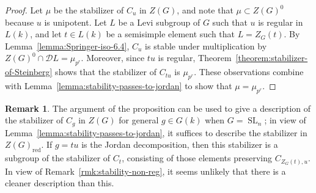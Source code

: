 \documentclass[11pt,reqno]{amsart}
\theoremstyle{definition}
\newtheorem{remark}[theorem]{Remark}
\renewcommand{\rm}{\mathrm}
\newcommand{\sD}{{\mathscr D}}
\DeclareMathOperator{\SL}{SL}
\begin{document}
\begin{proof}
    Let $\mu$ be the stabilizer of $C_u$ in $Z(G)$, and note that $\mu \subset Z(G)^0$ because $u$ is unipotent. Let $L$ be a Levi subgroup of $G$ such that $u$ is regular in $L(k)$, and let $t \in L(k)$ be a semisimple element such that $L = Z_G(t)$. By Lemma~\ref{lemma:Springer-iso-6.4}, $C_u$ is stable under multiplication by $Z(G)^0 \cap \sD L = \mu_{p^r}$. Moreover, since $tu$ is regular, Theorem~\ref{theorem:stabilizer-of-Steinberg} shows that the stabilizer of $C_{tu}$ is $\mu_{p^r}$. These observations combine with Lemma~\ref{lemma:stability-passes-to-jordan} to show that $\mu = \mu_{p^r}$.
\end{proof}

\begin{remark}
    The argument of the proposition can be used to give a description of the stabilizer of $C_g$ in $Z(G)$ for general $g \in G(k)$ when $G = \SL_n$; in view of Lemma~\ref{lemma:stability-passes-to-jordan}, it suffices to describe the stabilizer in $Z(G)_{\rm{red}}$. If $g = tu$ is the Jordan decomposition, then this stabilizer is a subgroup of the stabilizer of $C_t$, consisting of those elements preserving $C_{Z_G(t), u}$. In view of Remark~\ref{rmk:stability-non-reg}, it seems unlikely that there is a cleaner description than this.
\end{remark}
\end{document}
